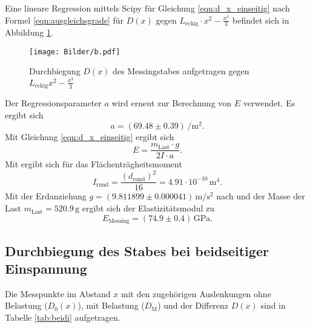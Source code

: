 Eine lineare Regression mittels Scipy \cite{scipy} für Gleichung \eqref{eqn:d_x_einseitig} nach Formel \eqref{eqn:ausgleichsgrade} für $D(x)$ gegen $L_{\mathrm{eckig}}\cdot x^2-\frac{x^3}{3}$
befindet sich in Abbildung \ref{fig:messing_einseitig}.

\begin{figure}
	\centering
	\texttt{[image: Bilder/b.pdf]}
	\caption{Durchbiegung $D(x)$ des Messingstabes aufgetragen gegen $L_{\mathrm{eckig}}x^2-\frac{x^3}{3}$}
	\label{fig:messing_einseitig}
\end{figure}
Der Regressionsparameter $a$ wird erneut zur Berechnung von $E$ verwendet.
Es ergibt sich
\begin{equation*}
	a=(69.48 \pm 0.39) \, \si{\per\square\meter} \text{.}
\end{equation*}
Mit Gleichung \eqref{eqn:d_x_einseitig} ergibt sich
\begin{equation}
	E=\frac{m_{\mathrm{Last}}\cdot g}{2I\cdot a} \text{.}
\end{equation}
Mit \cite{bla} ergibt sich für das Flächenträgheitsmoment
\begin{equation}
	I_{\mathrm{rund}}=\frac{(d_{\mathrm{rund}})^2}{16}= 4.91 \cdot 10^{-10} \,\si{\meter\tothe{4}}	 \text{.}
\end{equation}
Mit der Erdanziehung $g=(9.811899 \pm 0.000041) \,\si{\meter\per\square\second}$ nach \cite{G} und der Masse der Last $m_{\mathrm{Last}}=520.9\,\si{\gram}$ ergibt sich der Elastizitätsmodul zu
\begin{equation*}
	E_{\mathrm{Messing}}= (74.9 \pm 0.4)\,\si{\giga\pascal} \text{.}
\end{equation*}

\FloatBarrier
\subsection{Durchbiegung des Stabes bei beidseitiger Einspannung}

Die Messpunkte im Abstand $x$ mit den zugehörigen Auslenkungen ohne Belastung ($D_0(x)$), mit 
Belastung ($D_{\mathrm{M}}$) und der Differenz $D(x)$ sind in Tabelle \ref{tab:beidi}
aufgetragen.


